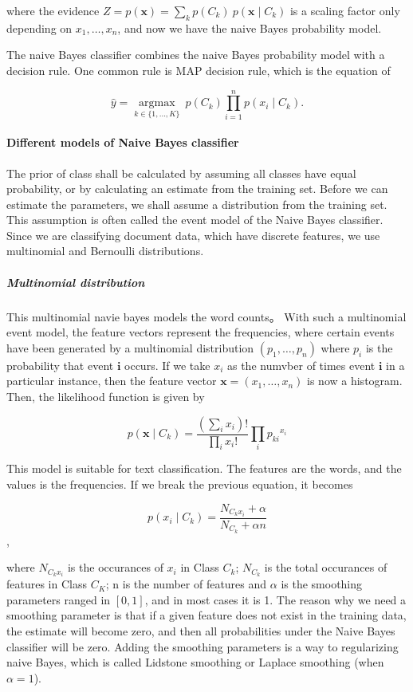 \documentclass[12pt,a4paper]{article}
\begin{document}
      where the evidence $Z = p(\mathbf{x}) = \sum_k p(C_k) \ p(\mathbf{x} \mid C_k)$ is a scaling factor only depending on $x_1, \dots, x_n$, and now we have the naive Bayes probability model.

      The naive Bayes classifier combines the naive Bayes probability model with a decision rule.  One common rule is MAP decision rule, which is the equation of

      \[
        \hat{y} = \underset{k \in \{1, \dots, K\}}{\operatorname{argmax}} \ p(C_k) \displaystyle\prod_{i=1}^n p(x_i \mid C_k).
      \]

      \paragraph{Different models of Naive Bayes classifier}

        The prior of class shall be calculated by assuming all classes have equal probability, or by calculating an estimate from the training set. Before we can estimate the parameters, we shall assume a distribution from the training set. This assumption is often called the event model of the Naive Bayes classifier. Since we are classifying document data, which have discrete features, we use multinomial and Bernoulli distributions.

        \subparagraph{Multinomial distribution}

        This multinomial navie bayes models the word counts。 With such a multinomial event model, the feature vectors represent the frequencies, where certain events have been generated by a multinomial distribution $(p_1, \dots, p_n)$ where $p_i$ is the probability that event $\mathbf{i}$ occurs. If we take $x_i$ as the numvber of times event $\mathbf{i}$ in a particular instance, then the feature vector $\mathbf{x} = (x_1, \dots, x_n)$ is now a histogram. Then, the likelihood function is given by

        $$
          p(\mathbf{x} \mid C_k) = \frac{(\sum_i x_i)!}{\prod_i x_i !} \prod_i {p_{ki}}^{x_i}
        $$

        This model is suitable for text classification. The features are the words, and the values is the frequencies. If we break the previous equation, it becomes

        $$
          p(x_i \mid C_k) = \frac{N_{C_kx_i} + \alpha}{N_{C_k} + \alpha n}
        $$,

        where $N_{C_kx_i}$ is the occurances of $x_i$ in Class $C_k$; $N_{C_k}$ is the total occurances of features in Class $C_K$; n is the number of features and $\alpha$ is the smoothing parameters ranged in $[0, 1]$, and in most cases it is 1. The reason why we need a smoothing parameter is that if a given feature does not exist in the training data, the estimate will become zero, and then all probabilities under the Naive Bayes classifier will be zero. Adding the smoothing parameters is a way to regularizing naive Bayes, which is called Lidstone smoothing or Laplace smoothing (when $\alpha=1$).
\end{document}
